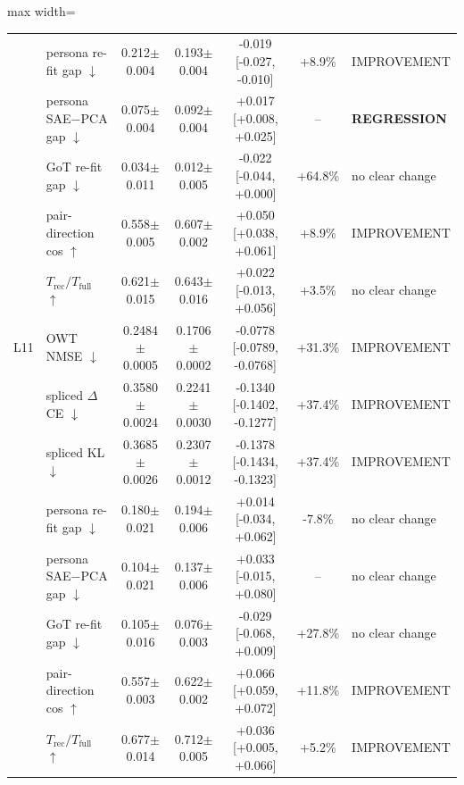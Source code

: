 \begin{table}[t]
\begin{adjustbox}{max width=\linewidth}
\begin{tabular}{llccccl}
 & persona re-fit gap $\downarrow$ & 0.212$\pm$0.004 & 0.193$\pm$0.004 & -0.019 [-0.027, -0.010] & +8.9\% & IMPROVEMENT \\
 & persona SAE$-$PCA gap $\downarrow$ & 0.075$\pm$0.004 & 0.092$\pm$0.004 & +0.017 [+0.008, +0.025] & -- & \textbf{REGRESSION} \\
 & GoT re-fit gap $\downarrow$ & 0.034$\pm$0.011 & 0.012$\pm$0.005 & -0.022 [-0.044, +0.000] & +64.8\% & no clear change \\
 & pair-direction cos $\uparrow$ & 0.558$\pm$0.005 & 0.607$\pm$0.002 & +0.050 [+0.038, +0.061] & +8.9\% & IMPROVEMENT \\
 & $T_{\text{rec}}/T_{\text{full}}$ $\uparrow$ & 0.621$\pm$0.015 & 0.643$\pm$0.016 & +0.022 [-0.013, +0.056] & +3.5\% & no clear change \\
\midrule
L11 & OWT NMSE $\downarrow$ & 0.2484$\pm$0.0005 & 0.1706$\pm$0.0002 & -0.0778 [-0.0789, -0.0768] & +31.3\% & IMPROVEMENT \\
 & spliced $\Delta$CE $\downarrow$ & 0.3580$\pm$0.0024 & 0.2241$\pm$0.0030 & -0.1340 [-0.1402, -0.1277] & +37.4\% & IMPROVEMENT \\
 & spliced KL $\downarrow$ & 0.3685$\pm$0.0026 & 0.2307$\pm$0.0012 & -0.1378 [-0.1434, -0.1323] & +37.4\% & IMPROVEMENT \\
 & persona re-fit gap $\downarrow$ & 0.180$\pm$0.021 & 0.194$\pm$0.006 & +0.014 [-0.034, +0.062] & -7.8\% & no clear change \\
 & persona SAE$-$PCA gap $\downarrow$ & 0.104$\pm$0.021 & 0.137$\pm$0.006 & +0.033 [-0.015, +0.080] & -- & no clear change \\
 & GoT re-fit gap $\downarrow$ & 0.105$\pm$0.016 & 0.076$\pm$0.003 & -0.029 [-0.068, +0.009] & +27.8\% & no clear change \\
 & pair-direction cos $\uparrow$ & 0.557$\pm$0.003 & 0.622$\pm$0.002 & +0.066 [+0.059, +0.072] & +11.8\% & IMPROVEMENT \\
 & $T_{\text{rec}}/T_{\text{full}}$ $\uparrow$ & 0.677$\pm$0.014 & 0.712$\pm$0.005 & +0.036 [+0.005, +0.066] & +5.2\% & IMPROVEMENT \\
\bottomrule
\end{tabular}
\end{adjustbox}
\end{table}
